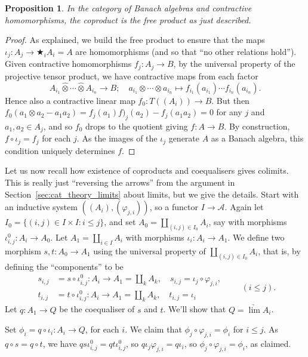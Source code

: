 \documentclass[a4paper,11pt]{article}
\newcommand{\mc}[1]{{\mathcal{#1}}}
\newcommand{\proten}{\widehat\otimes}
\newtheorem{proposition}[lemma]{Proposition}
\theoremstyle{definition}
\begin{document}
\begin{proposition}\label{prop:coprod_alg_freeprod}
In the category of Banach algebras and contractive homomorphisms, the coproduct is the free product as just described.
\end{proposition}
\begin{proof}
As explained, we build the free product to ensure that the maps $\iota_j \colon A_j \to \bigstar_i A_i = A$ are homomorphisms (and so that ``no other relations hold'').  Given contractive homomorphisms $f_j \colon A_j \to B$, by the universal property of the projective tensor product, we have contractive maps from each factor
\[ A_{i_1} \proten \cdots \proten A_{i_n} \to B; \quad a_{i_1}\otimes\cdots\otimes a_{i_n} \mapsto
f_{i_1}(a_{i_1}) \cdots f_{i_n}(a_{i_n}). \]
Hence also a contractive linear map $f_0 \colon T((A_i)) \to B$.  But then $f_0(a_1\otimes a_2-a_1a_2) = f_j(a_1)f)_j(a_2) - f_j(a_1a_2) = 0$ for any $j$ and $a_1,a_2\in A_j$, and so $f_0$ drops to the quotient giving $f \colon A \to B$.  By construction, $f\circ\iota_j = f_j$ for each $j$.  As the images of the $\iota_j$ generate $A$ as a Banach algebra, this condition uniquely determines $f$.
\end{proof}

Let us now recall how existence of coproducts and coequalisers gives colimits.  This is really just ``reversing the arrows'' from the argument in Section~\ref{sec:cat_theory_limits} about limits, but we give the details.  Start with an inductive system $((A_i), (\varphi_{j,i}))$, so a functor $I\to \mc A$.  Again let $I_0 = \{ (i,j)\in I\times I: i\leq j \}$, and set $A_0 = \coprod_{(i,j)\in I_0} A_i$, say with morphisms $\iota^0_{i,j} \colon A_i \to A_0$.  Let $A_1 = \coprod_{i\in I} A_i$ with morphisms $\iota_i \colon A_i \to A_1$.  We define two morphism $s,t \colon A_0 \to A_1$ using the universal property of $\coprod_{(i,j)\in I_0} A_i$, that is, by defining the ``components'' to be
\[ \begin{split}
    s_{i,j} &= s \circ \iota^0_{i,j} \colon A_i \to A_1 = \coprod_k A_k, \quad s_{i,j} = \iota_j\circ\varphi_{j,i}, \\
    t_{i,j} &= t\circ\iota^0_{i,j} \colon A_i \to A_1 = \coprod_k A_k, \quad t_{i,j} = \iota_i
\end{split}
\qquad (i\leq j). \]
Let $q\colon A_1\to Q$ be the coequaliser of $s$ and $t$.  We'll show that $Q = \underrightarrow{\lim} A_i$.

Set $\phi_i = q \circ \iota_i \colon A_i \to Q$, for each $i$.  We claim that $\phi_j \circ \varphi_{j,i} = \phi_i$ for $i\leq j$.  As $q\circ s = q\circ t$, we have $q s \iota^0_{i,j} = q t \iota^0_{i,j}$, so $q \iota_j \varphi_{j,i} = q \iota_i$, so $\phi_j\circ \varphi_{j,i} = \phi_i$, as claimed.
\end{document}
